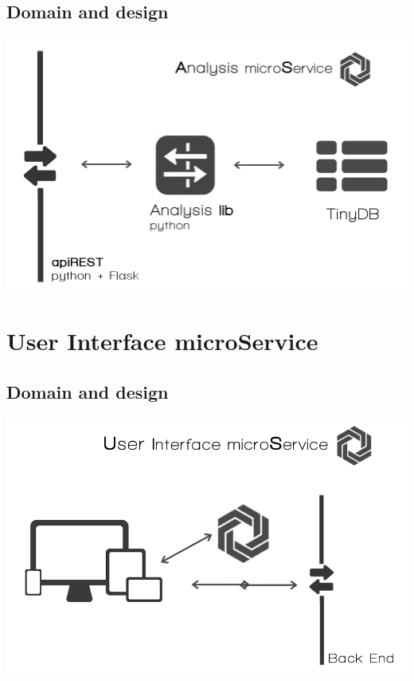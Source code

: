 \subsection{Domain and design}
\begin{center}
\includegraphics[scale=0.4]{img/graphics/ams.png}
\end{center}


\section{User Interface microService}

\subsection{Domain and design}
\begin{center}
\includegraphics[scale=0.4]{img/graphics/ui.png}
\end{center}


